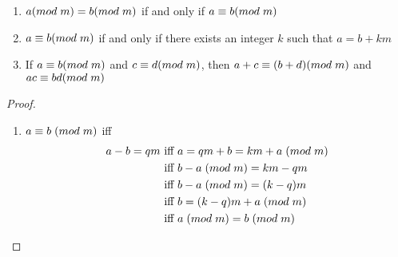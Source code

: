 \begin{exercise} \label{0.66}
	\begin{enumerate}
	    \item \( a (mod \hspace{1mm} m) = b (mod \hspace{1mm} m) \) if and only if \( a \equiv b (mod \hspace{1mm} m) \)
	    
	    \item \( a \equiv b (mod \hspace{1mm} m) \) if and only if there exists an integer \( k \) such that \( a = b + km \)
	    
	    \item If \( a \equiv b (mod \hspace{1mm} m) \) and \( c \equiv d (mod \hspace{1mm} m) \), then \( a + c \equiv (b+d) (mod \hspace{1mm} m) \) and \( ac \equiv bd (mod \hspace{1mm} m) \)
	\end{enumerate}
	    \begin{proof}
	        \begin{enumerate}
	            \item \( a \equiv b \hspace{1mm} (mod \hspace{1mm} m) \) iff
	            \begin{align*}
	                a-b = qm &\text{ iff } a = qm+b = km + a \hspace{1mm} (mod \hspace{1mm} m) \\
	                &\text{ iff } b-a \hspace{1mm}(mod \hspace{1mm} m) = km - qm \\
	                &\text{ iff } b-a \hspace{1mm}(mod \hspace{1mm} m)=(k-q)m \\
	                &\text{ iff } b=(k-q)m+a \hspace{1mm} (mod \hspace{1mm} m) \\
	                &\text{ iff } a \hspace{1mm} (mod \hspace{1mm} m) = b \hspace{1mm} (mod \hspace{1mm} m)
	            \end{align*}
	            

\end{enumerate}
\end{proof}
\end{exercise}
